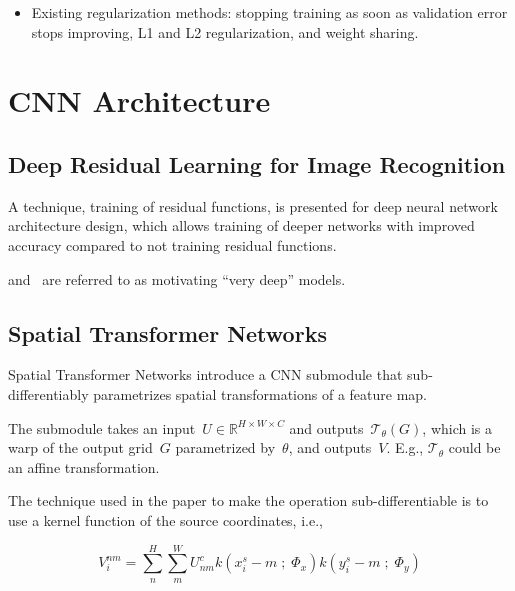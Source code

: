 \documentclass[a4paper, 12pt]{article}
\begin{document}
\begin{itemize}
        \item Existing regularization methods: stopping training as soon as
                validation error stops improving, L1 and L2 regularization, and
                weight sharing\citet{Nowlan:1992:SNN:148167.148169}.
\end{itemize}


\section{CNN Architecture}


\subsection{Deep Residual Learning for Image
            Recognition\citet{DBLP:journals/corr/HeZRS15}}

A technique, training of residual functions, is presented for deep neural
network architecture design, which allows training of deeper networks with
improved accuracy compared to not training residual functions.

\citet{going-deeper-szegedy43022} and~\citet{DBLP:journals/corr/SimonyanZ14a} are
referred to as motivating ``very deep'' models.



\subsection{Spatial Transformer Networks~\citet{jaderberg-spatial-2015}}

Spatial Transformer Networks introduce a CNN submodule that sub-differentiably
parametrizes spatial transformations of a feature map.

The submodule takes an input~$U \in \mathbb{R}^{H \times W \times C}$ and
outputs~$\mathcal{T}_\theta(G)$, which is a warp of the output grid~$G$
parametrized by~$\theta$, and outputs~$V$. E.g., $\mathcal{T}_\theta$ could be
an affine transformation.

The technique used in the paper to make the operation sub-differentiable is to
use a kernel function of the source coordinates, i.e.,

\begin{equation*}
        V_i^{nm} = \sum_n^H \sum_m^W U^c_{nm} k(x_i^s - m\;;\; \Phi_x)
                k(y_i^s - m\;;\; \Phi_y)
\end{equation*}
\end{document}
